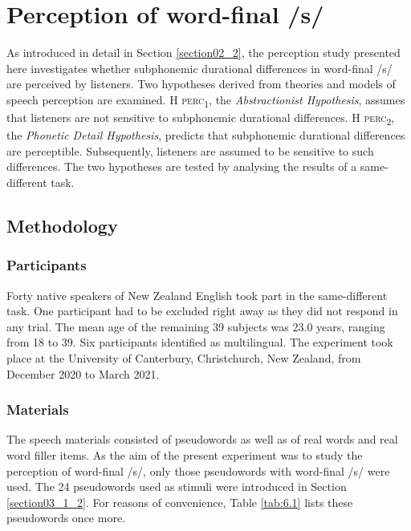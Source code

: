 \chapter{Perception of word-final /s/}\label{chapter06}

As introduced in detail in Section \ref{section02_2}, the perception study presented here investigates whether subphonemic durational differences in word-final /s/ are perceived by listeners. Two hypotheses derived from theories and models of speech perception are examined. \textsc{H perc\textsubscript{1}}, the \textit{Abstractionist Hypothesis}, assumes that listeners are not sensitive to subphonemic durational differences. \textsc{H perc\textsubscript{2}}, the \textit{Phonetic Detail Hypothesis}, predicts that subphonemic durational differences are perceptible. Subsequently, listeners are assumed to be sensitive to such differences. The two hypotheses are tested by analysing the results of a same-different task.

\section{Methodology}\label{section06_1}

\subsection{Participants}\label{section06_1_1}

Forty native speakers of New Zealand English took part in the same-different task. One participant had to be excluded right away as they did not respond in any trial. The mean age of the remaining 39 subjects was 23.0 years, ranging from 18 to 39. Six participants identified as multilingual. The experiment took place at the University of Canterbury, Christchurch, New Zealand, from December 2020 to March 2021. 

\subsection{Materials}\label{section06_1_2}

The speech materials consisted of pseudowords as well as of real words and real word filler items. As the aim of the present experiment was to study the perception of word-final /s/, only those pseudowords with word-final /s/ were used. The 24 pseudowords used as stimuli were introduced in Section \ref{section03_1_2}. For reasons of convenience, Table \ref{tab:6.1} lists these pseudowords once more.

